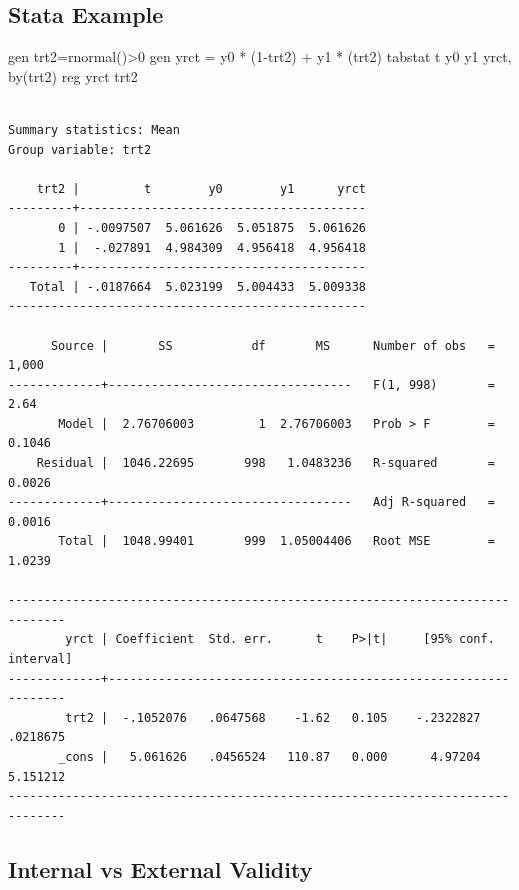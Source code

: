 \documentclass[
  letterpaper,
  DIV=11,
  numbers=noendperiod]{scrartcl}
\newenvironment{Shaded}{\begin{snugshade}}{\end{snugshade}}
\newcommand{\KeywordTok}[1]{\textcolor[rgb]{0.00,0.23,0.31}{#1}}
\newcommand{\NormalTok}[1]{\textcolor[rgb]{0.00,0.23,0.31}{#1}}
\begin{document}
\hypertarget{stata-example}{%
\subsection{Stata Example}\label{stata-example}}

\begin{Shaded}
\begin{Highlighting}[]
\KeywordTok{gen}\NormalTok{ trt2=rnormal()\textgreater{}0}
\KeywordTok{gen}\NormalTok{ yrct = y0 * (1{-}trt2) +  y1 * (trt2)}
\KeywordTok{tabstat}\NormalTok{ t y0 y1 yrct, }\KeywordTok{by}\NormalTok{(trt2)}
\KeywordTok{reg}\NormalTok{ yrct trt2}
\end{Highlighting}
\end{Shaded}

\begin{verbatim}

Summary statistics: Mean
Group variable: trt2 

    trt2 |         t        y0        y1      yrct
---------+----------------------------------------
       0 | -.0097507  5.061626  5.051875  5.061626
       1 |  -.027891  4.984309  4.956418  4.956418
---------+----------------------------------------
   Total | -.0187664  5.023199  5.004433  5.009338
--------------------------------------------------

      Source |       SS           df       MS      Number of obs   =     1,000
-------------+----------------------------------   F(1, 998)       =      2.64
       Model |  2.76706003         1  2.76706003   Prob > F        =    0.1046
    Residual |  1046.22695       998   1.0483236   R-squared       =    0.0026
-------------+----------------------------------   Adj R-squared   =    0.0016
       Total |  1048.99401       999  1.05004406   Root MSE        =    1.0239

------------------------------------------------------------------------------
        yrct | Coefficient  Std. err.      t    P>|t|     [95% conf. interval]
-------------+----------------------------------------------------------------
        trt2 |  -.1052076   .0647568    -1.62   0.105    -.2322827    .0218675
       _cons |   5.061626   .0456524   110.87   0.000      4.97204    5.151212
------------------------------------------------------------------------------
\end{verbatim}

\hypertarget{internal-vs-external-validity}{%
\subsection{Internal vs External
Validity}\label{internal-vs-external-validity}}
\end{document}
